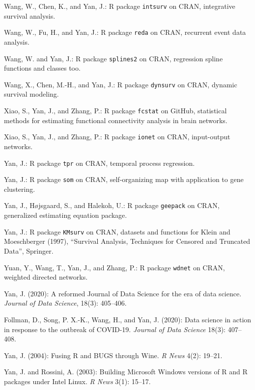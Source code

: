 \documentclass[Statistics]{vita}
\begin{document}
\begin{vita}
\begin{Publications}
\begin{Software}
  \item *Wang, W., Chen, K., and Yan, J.: R package \texttt{intsurv} on CRAN, integrative survival analysis.
  \item *Wang, W., Fu, H., and Yan, J.: R package \texttt{reda} on CRAN, recurrent event data analysis.
  \item *Wang, W. and Yan, J.: R package \texttt{splines2} on CRAN, regression spline functions and classes too.
  \item *Wang, X., Chen, M.-H., and Yan, J.: R package \texttt{dynsurv} on CRAN, dynamic survival modeling.
  \item *Xiao, S., Yan, J., and Zhang, P.: R package \texttt{fcstat} on GitHub, statistical methods for estimating functional connectivity analysis in brain networks.
  \item *Xiao, S., Yan, J., and Zhang, P.: R package \texttt{ionet} on CRAN, input-output networks.
  \item Yan, J.: R package \texttt{tpr} on CRAN, temporal process regression.
  \item Yan, J.: R package \texttt{som} on CRAN, self-organizing map with application to gene clustering.
  \item Yan, J., H\o{}jsgaard, S., and Halekoh, U.: R package \texttt{geepack} on CRAN, generalized estimating equation package.
  \item Yan, J.: R package \texttt{KMsurv} on CRAN,  datasets and functions for Klein and Moeschberger (1997), ``Survival Analysis, Techniques for Censored and Truncated Data'', Springer.
  \item *Yuan, Y., Wang, T., Yan, J., and Zhang, P.: R package \texttt{wdnet} on CRAN, weighted directed networks.
  \end{Software}
  \begin{NonRefereedPublications}
  \item Yan, J. (2020): A reformed Journal of Data Science for the era of data science. {\em Journal of Data Science\/}, 18(3): 405--406.
  \item Follman, D., Song, P. X.-K., Wang, H., and Yan, J. (2020): Data science in action in response to the outbreak of COVID-19. {\em Journal of Data Science\/} 18(3): 407--408.
  \item Yan, J. (2004): Fusing {R} and {BUGS} through {Wine}. {\em R News\/} 4(2): 19--21.
  \item Yan, J. and Rossini, A. (2003): Building {M}icrosoft {W}indows versions of {R} and {R} packages under {I}ntel {L}inux. {\em R News\/} 3(1): 15--17.

\end{NonRefereedPublications}
\end{Publications}
\end{vita}
\end{document}
